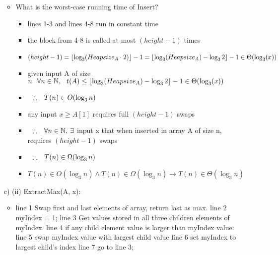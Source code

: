 \documentclass[12pt, oneside]{article}
\DeclarePairedDelimiter\floor{\lfloor}{\rfloor}
\newcommand\tab[1][0.25cm]{\hspace*{#1}}
\newcommand\imp{\rightarrow}
\newcommand\thfr{\tab \therefore \tab}
\begin{document}
\begin{itemize}
\begin{itemize}
	\item What is the worst-case running time of Insert?
		\begin{itemize}
		\item lines 1-3 and lines 4-8 run in constant time
		\item the block from 4-8 is called at most $(height-1)$ times
		\item $(height-1) = \floor{\log_{3}(Heapsize_A\cdot2)} - 1 = \floor{\log_{3}(Heapsize_A)-\log_{3}2} - 1 \in \Theta(\log_3(x))$ 
		\item given input A of size $n \tab \forall n \in \mathbb{N}, \tab t(A) \leq \floor{\log_{3}(Heapsize_A)-\log_{3}2} - 1 \in \Theta(\log_3(x))$
		\item $ \thfr T(n) \in O(\log_{3}n)$
		\item any input $x \geq A[1]$ requires full $(height-1)$ swaps
		\item $\thfr \forall n \in \mathbb{N}, \: \exists$ input x that when inserted in array A of size n, requires $(height-1)$ swaps
		\item $ \thfr T(n) \in \Omega(\log_{3}n)$
		\item $T(n) \in O(\log_{3}n) \land T(n) \in \Omega(\log_{3}n) \imp T(n) \in \Theta(\log_{3}n)$
		\end{itemize}
	\end{itemize}
	\newpage

\item [c) (ii)]  
	\tab[0.75cm]ExtractMax(A, x): 
	\begin{itemize}
	\item line 1 \tab	Swap first and last elements of array, return last as max. \newline
	line 2 \tab	myIndex = 1;\newline	
	line 3 \tab Get values stored in all three children elements of myIndex. \newline
	line 4 \tab	if any child element value is larger than myIndex value: \newline
	line 5 \tab[0.75cm]	swap myIndex value with largest child value \newline
	line 6 \tab[0.75cm]	set myIndex to largest child's index \newline
	line 7 \tab[0.75cm]	go to line 3; \newline
	

\end{itemize}
\end{itemize}
\end{document}
